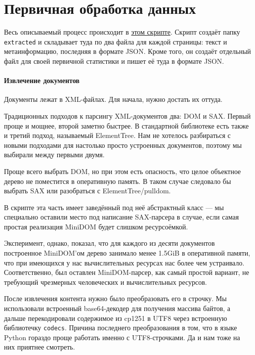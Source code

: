 \section{Первичная обработка данных}

Весь описываемый процесс происходит в \href{https://github.com/vasalf/hse-web-search-homework/blob/master/1/extract.py}{этом скрипте}.
Скрипт создаёт папку \texttt{extracted} и складывает туда по два файла для каждой страницы: текст и метаинформацию, последняя в формате JSON.
Кроме того, он создаёт отдельный файл для своей первичной статистики и пишет её туда в формате JSON.

\paragraph{Извлечение документов}

Документы лежат в XML-файлах. Для начала, нужно достать их оттуда.

Традиционных подходов к парсингу XML-документов два: DOM и SAX.
Первый проще и мощнее, второй заметно быстрее.
В стандартной библиотеке есть также и третий подход, называемый ElementTree.
Нам не хотелось разбираться с новыми подходами для настолько просто устроенных документов, поэтому мы выбирали между первыми двумя.

Проще всего выбрать DOM, но при этом есть опасность, что целое объектное дерево не поместится в оперативную память.
В таком случае следовало бы выбрать SAX или разобраться с ElementTree/pulldom.

В скрипте эта часть имеет заведённый под неё абстрактный класс — мы специально оставили место под написание SAX-парсера в случае, если самая простая реализация MiniDOM будет слишком ресурсоёмкой.

Эксперимент, однако, показал, что для каждого из десяти документов построенное MiniDOM'ом дерево занимало менее 1.5GiB в оперативной памяти, что при имеющихся у нас вычислительных ресурсах нас более чем устраивало. Соответственно, был оставлен MiniDOM-парсер, как самый простой вариант, не требующий чрезмерных человеческих и вычислительных ресурсов.

После извлечения контента нужно было преобразовать его в строчку. Мы использовали встроенный base64-декодер для получения массива байтов, а дальше перекодировали содержимое из cp1251 в UTF8 через встроенную библиотечку \texttt{codecs}. Причина последнего преобразования в том, что в языке Python гораздо проще работать именно с UTF8-строчками. Да и нам тоже на них приятнее смотреть.

